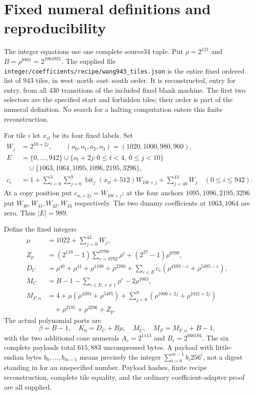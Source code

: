 \section{Fixed numeral definitions and reproducibility}
The integer equations use one complete
source34 tuple. Put $\rho=2^{121}$ and $B=\rho^{8801}=2^{1064921}$.
The supplied file \texttt{integer/coefficients/recipe/wang943\_tiles.json}
is the entire fixed ordered list of $943$ tiles, in west--north--east--south
order. It is reconstructed, entry for entry, from all $430$ transitions of
the included fixed blank machine. The first two selectors are the specified
start and forbidden tiles; their order is part of the numeral definition.
No search for a halting computation enters this finite reconstruction.

For tile $i$ let $x_{it}$ be its four fixed labels. Set
\begin{align*}
 W_j&=2^{10+2j},\qquad (o_0,o_1,o_2,o_3)=(1020,1000,980,960),\\
 E&=\{0,\ldots,942\}\cup\{o_t+2j:0\le t<4,\ 0\le j<10\}\\
  &\quad\cup\{1063,1064,1095,1096,2195,3296\},\\
 c_i&=1+\sum_{t=0}^3\sum_{j=0}^9
       \operatorname{bit}_j(x_{it}+512)W_{10t+j}
       +\sum_{j=40}^{43}W_j\quad(0\le i\le942).
\end{align*}
At a copy position put $c_{o_t+2j}=W_{10t+j}$; at the four anchors
$1095,1096,2195,3296$ put $W_{40},W_{41},W_{42},W_{43}$ respectively.
The two dummy coefficients at $1063,1064$ are zero. Thus $|E|=989$.

Define the fixed integers
\begin{align*}
 \mu&=1022+\sum_{j=0}^{43}W_j,\\
 Z_p&=(2^{119}-1)\sum_{e=8792}^{8798}\rho^e
                  +(2^{27}-1)\rho^{8799},\\
 D_C&=\rho^{40}+\rho^{41}+\rho^{1100}+\rho^{2200}
       +\sum_{e\in E}c_e(\rho^{4393-e}+\rho^{5495-e}),\\
 M_C&=B-1-\sum_{e\in E,\ e\ne1}\rho^e-2\rho^{1063},\\
 M_{F,n}&=4+\mu(\rho^{4393}+\rho^{5495})
       +\sum_{j=0}^9(\rho^{1000+2j}+\rho^{1021+2j})\\
       &\quad+\rho^{2195}+\rho^{3296}+Z_p.
\end{align*}
The actual polynomial ports are
\[
 \beta=B-1,\quad K_0=D_C+B\rho,\quad M_C,\quad M_F=M_{F,n}+B-1,
\]
with the two additional cone numerals $A_c=2^{1113}$ and $B_c=2^{666104}$.
The six complete payloads total $615{,}883$ uncompressed bytes. A payload
with little-endian bytes $b_0,\ldots,b_{m-1}$ means precisely the integer
$\sum_{i=0}^{m-1}b_i256^i$, not a digest standing in for an unspecified
number. Payload hashes, finite recipe reconstruction, complete tile equality,
and the ordinary coefficient-adapter proof are all supplied.


